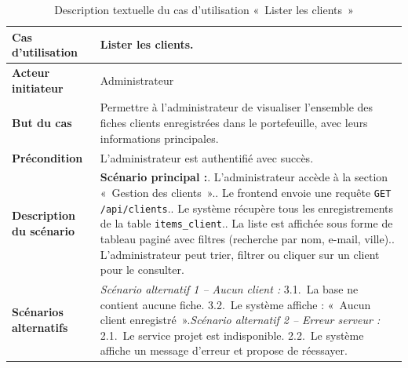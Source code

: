 \begin{table}[H]
  \caption{Description textuelle du cas d'utilisation «~Lister les clients~»}
  \label{tab:cu-lister-clients}
  \centering
  \begin{tabularx}{\textwidth}{|L{3.8cm}|X|}
    \hline
    \textbf{Cas d'utilisation} & Lister les clients. \\
    \hline
    \textbf{Acteur initiateur} & Administrateur \\
    \hline
    \textbf{But du cas} & Permettre à l'administrateur de visualiser l'ensemble des fiches clients enregistrées dans le portefeuille, avec leurs informations principales. \\
    \hline
    \textbf{Précondition} & L'administrateur est authentifié avec succès. \\
    \hline
    \textbf{Description du scénario} &
    \textbf{Scénario principal :}. L'administrateur accède à la section «~Gestion des clients~».. Le frontend envoie une requête \texttt{GET /api/clients}.. Le système récupère tous les enregistrements de la table \texttt{items\_client}.. La liste est affichée sous forme de tableau paginé avec filtres (recherche par nom, e-mail, ville).. L'administrateur peut trier, filtrer ou cliquer sur un client pour le consulter.\\
    \hline
    \textbf{Scénarios alternatifs} &
    \textit{Scénario alternatif 1 -- Aucun client :}\newline
    \hspace*{6pt}3.1.~La base ne contient aucune fiche.\newline
    \hspace*{6pt}3.2.~Le système affiche : «~Aucun client enregistré~».\newline[2pt]
    \textit{Scénario alternatif 2 -- Erreur serveur :}\newline
    \hspace*{6pt}2.1.~Le service projet est indisponible.\newline
    \hspace*{6pt}2.2.~Le système affiche un message d'erreur et propose de réessayer.\\
    \hline
  \end{tabularx}
\end{table}

